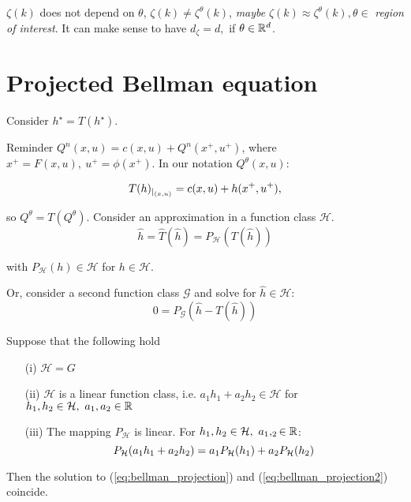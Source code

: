 \(\zeta(k)\) does not depend on \(\theta\), \(\zeta(k)\neq \zeta^\theta(k)\),
\textit{maybe} \(\zeta(k)\approx \zeta^\theta(k),\theta\in\) \textit{region of interest}.
It can make sense to have \(d_\zeta=d,\) if \(\theta\in \mathbb{R}^d\).

\section{Projected Bellman equation}

Consider \(h^\star=T(h^\star)\). 

Reminder \(Q^n(x,u)=c(x,u)+Q^n(x^+,u^+)\), where \(x^+=F(x,u),\ u^+=\phi(x^+)\). In our notation \(Q^\theta(x,u)\):

\begin{align*}
    T(h)_{|_{(x,u)}}=c(x,u)+h(x^+,u^+),
\end{align*}

so \(Q^\theta=T\left(Q^\theta\right)\). Consider an approximation in a function class \(\mathcal{H}\).
\begin{equation}\label{eq:bellman_projection}
    \hat{h}=\hat{T}(\hat{h})=P_{\mathcal{H}}(T(\hat{h}))
\end{equation}

with \(P_\mathcal{H}(h)\in\mathcal{H}\) for \(h\in \mathcal{H}\).

Or, consider a second function class \(\mathcal{G}\) and solve 
for \(\hat{h}\in \mathcal{H}:\)
\begin{equation}\label{eq:bellman_projection2}
    0=P_\mathcal{G}(\hat{h}-T(\hat{h}))
\end{equation}

\begin{proposition}\label{prop:48}
    Suppose that the following hold
    \begin{enumerate}
        \item[(i)] \(\mathcal{H}=G\)
        \item[(ii)] \(\mathcal{H}\) is a linear function class, i.e. \(a_1h_1+a_2h_2\in\mathcal{H}\) for \(h_1,h_2\in\mathcal{H},\ a_1,a_2\in\R\) 
        \item[(iii)] The mapping \(P_\mathcal{H}\) is linear. For  \(h_1,h_2\in \mathcal{H},\ a_1,_2\in \mathbb{R}\): \[P_{\mathcal{H}}(a_1h_1+a_2h_2)=a_1P_{\mathcal{H}}(h_1)+a_2P_{\mathcal{H}}(h_2)\]
    \end{enumerate}
    Then the solution to (\ref{eq:bellman_projection}) and (\ref{eq:bellman_projection2}) coincide.
\end{proposition}

